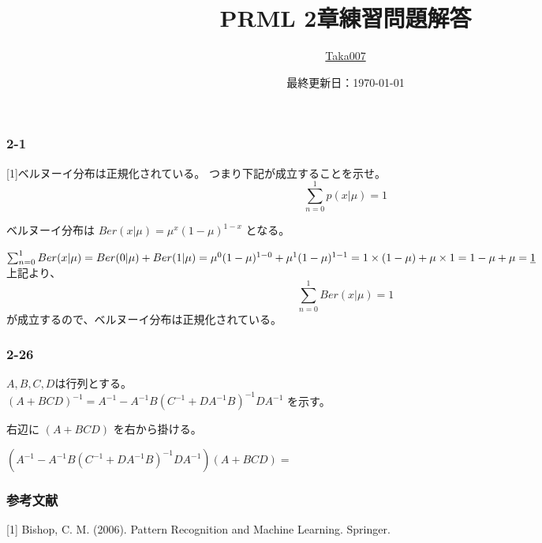 \documentclass[platex,dvipdfmx]{jlreq}            %
\title{PRML 2章練習問題解答}
\author{\href{https://github.com/Taka0007}{Taka007}}
\date{最終更新日：\today}
\begin{document}
\maketitle

\subsubsection*{2-1}

[1]ベルヌーイ分布は正規化されている。
つまり下記が成立することを示せ。
$$
\sum_{n=0}^1 p(x| \mu ) = 1
$$

ベルヌーイ分布は
$
Ber(x| \mu) = \mu^x (1-\mu)^{1-x}
$
となる。

$
\sum_{n=0}^1 Ber(x| \mu)
= Ber(0| \mu) + Ber(1| \mu)
= \mu^0 (1-\mu)^{1-0} + \mu^1 (1-\mu)^{1-1}
= 1 \times (1-\mu) + \mu \times 1 \\
= 1-\mu + \mu
= \underline{1}
$
\\

上記より、
$$
\sum_{n=0}^1 Ber(x| \mu) = 1
$$
が成立するので、ベルヌーイ分布は正規化されている。






\subsubsection*{2-26}
$A,B,C,D$は行列とする。\\
$
(A + BCD)^{-1} 
=  A^{-1} -  A^{-1}B (C^{-1} + D A^{-1} B)^{-1} D A^{-1}
$
を示す。

右辺に
$
(A + BCD)
$
を右から掛ける。

$
(A^{-1} -  A^{-1}B (C^{-1} + D A^{-1} B)^{-1} D A^{-1}) (A + BCD)
= 
$












\subsubsection*{参考文献}

[1] Bishop, C. M. (2006). Pattern Recognition and Machine Learning. Springer.
\end{document}
